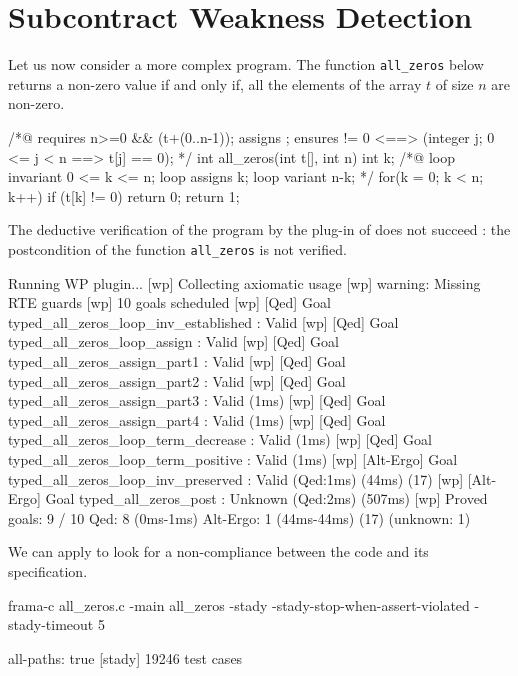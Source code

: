 \documentclass[web]{frama-c-book}
\begin{document}
\section{Subcontract Weakness Detection}

Let us now consider a more complex program. The function \lstinline'all_zeros' below returns a non-zero value if and only if, all the elements of the array $t$ of size $n$ are non-zero.

\begin{ccode}
/*@ requires n>=0 && \valid(t+(0..n-1));
    assigns \nothing;
    ensures \result != 0 <==> 
      (\forall integer j; 0 <= j < n ==> t[j] == 0);
*/
int all_zeros(int t[], int n) {
  int k;
  /*@ loop invariant 0 <= k <= n;
      loop assigns k;
      loop variant n-k; 
  */
  for(k = 0; k < n; k++) 
    if (t[k] != 0) 
      return 0;
  return 1;
}
\end{ccode}

The deductive verification of the program by the  plug-in of \framac does not succeed : the postcondition of the function \lstinline'all_zeros' is not verified.

\begin{shell}
[wp] Running WP plugin...
[wp] Collecting axiomatic usage
[wp] warning: Missing RTE guards
[wp] 10 goals scheduled
[wp] [Qed] Goal typed_all_zeros_loop_inv_established : Valid
[wp] [Qed] Goal typed_all_zeros_loop_assign : Valid
[wp] [Qed] Goal typed_all_zeros_assign_part1 : Valid
[wp] [Qed] Goal typed_all_zeros_assign_part2 : Valid
[wp] [Qed] Goal typed_all_zeros_assign_part3 : Valid (1ms)
[wp] [Qed] Goal typed_all_zeros_assign_part4 : Valid (1ms)
[wp] [Qed] Goal typed_all_zeros_loop_term_decrease : Valid (1ms)
[wp] [Qed] Goal typed_all_zeros_loop_term_positive : Valid (1ms)
[wp] [Alt-Ergo] Goal typed_all_zeros_loop_inv_preserved : Valid (Qed:1ms) (44ms) (17)
[wp] [Alt-Ergo] Goal typed_all_zeros_post : Unknown (Qed:2ms) (507ms)
[wp] Proved goals:    9 / 10
     Qed:             8  (0ms-1ms)
     Alt-Ergo:        1  (44ms-44ms) (17) (unknown: 1)
\end{shell}

We can apply \stady to look for a non-compliance between the code and its specification.

\begin{shell}
  frama-c all_zeros.c -main all_zeros -stady -stady-stop-when-assert-violated
  -stady-timeout 5
\end{shell}

\begin{shell}
[stady] all-paths: true
[stady] 19246 test cases
\end{shell}
\end{document}
